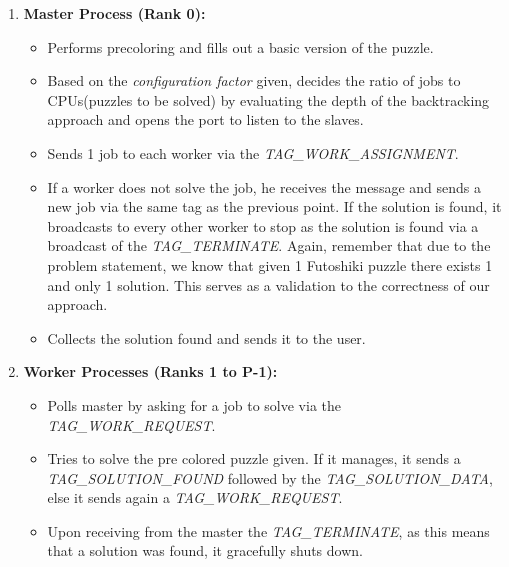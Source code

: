 \begin{enumerate}
    \item \textbf{Master Process (Rank 0):}
    \begin{itemize}
        \item Performs precoloring and fills out a basic version of the puzzle.
        \item Based on the \textit{configuration factor} given, decides the ratio of jobs to CPUs(puzzles to be solved) by evaluating the depth of the backtracking approach and opens the port to listen to the slaves.
        \item Sends 1 job to each worker via the \textit{TAG\_WORK\_ASSIGNMENT}.
        \item If a worker does not solve the job, he receives the message and sends a new job via the same tag as the previous point. If the solution is found, it broadcasts to every other worker to stop as the solution is found via a broadcast of the \textit{TAG\_TERMINATE}. Again, remember that due to the problem statement, we know that given 1 Futoshiki puzzle there exists 1 and only 1 solution. This serves as a validation to the correctness of our approach.
        \item Collects the solution found and sends it to the user.
    \end{itemize}
    
    \item \textbf{Worker Processes (Ranks 1 to P-1):}
    \begin{itemize}
        \item Polls master by asking for a job to solve via the \textit{TAG\_WORK\_REQUEST}.
        \item Tries to solve the pre colored puzzle given. If it manages, it sends a \textit{TAG\_SOLUTION\_FOUND} followed by the \textit{TAG\_SOLUTION\_DATA}, else it sends again a \textit{TAG\_WORK\_REQUEST}.
        \item Upon receiving from the master the \textit{TAG\_TERMINATE}, as this means that a solution was found, it gracefully shuts down.
    \end{itemize}
\end{enumerate}


